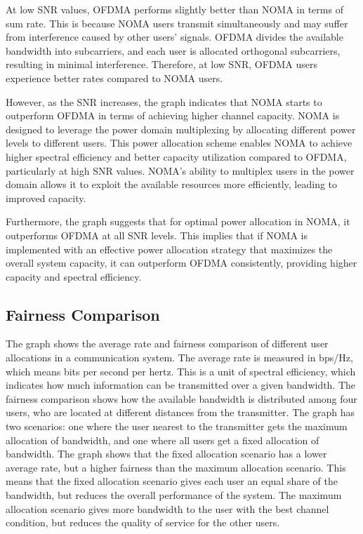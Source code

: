 \documentclass[conference]{IEEEtran}
\begin{document}
At low SNR values, OFDMA performs slightly better than NOMA in terms of sum rate. This is because NOMA users transmit simultaneously and may suffer from interference caused by other users' signals. OFDMA divides the available bandwidth into subcarriers, and each user is allocated orthogonal subcarriers, resulting in minimal interference. Therefore, at low SNR, OFDMA users experience better rates compared to NOMA users.

However, as the SNR increases, the graph indicates that NOMA starts to outperform OFDMA in terms of achieving higher channel capacity. NOMA is designed to leverage the power domain multiplexing by allocating different power levels to different users. This power allocation scheme enables NOMA to achieve higher spectral efficiency and better capacity utilization compared to OFDMA, particularly at high SNR values. NOMA's ability to multiplex users in the power domain allows it to exploit the available resources more efficiently, leading to improved capacity.

Furthermore, the graph suggests that for optimal power allocation in NOMA, it outperforms OFDMA at all SNR levels. This implies that if NOMA is implemented with an effective power allocation strategy that maximizes the overall system capacity, it can outperform OFDMA consistently, providing higher capacity and spectral efficiency.

\subsection{Fairness Comparison}

The graph shows the average rate and fairness comparison of different user allocations in a communication system. The average rate is measured in bps/Hz, which means bits per second per hertz. This is a unit of spectral efficiency, which indicates how much information can be transmitted over a given bandwidth. The fairness comparison shows how the available bandwidth is distributed among four users, who are located at different distances from the transmitter. The graph has two scenarios: one where the user nearest to the transmitter gets the maximum allocation of bandwidth, and one where all users get a fixed allocation of bandwidth. The graph shows that the fixed allocation scenario has a lower average rate, but a higher fairness than the maximum allocation scenario. This means that the fixed allocation scenario gives each user an equal share of the bandwidth, but reduces the overall performance of the system. The maximum allocation scenario gives more bandwidth to the user with the best channel condition, but reduces the quality of service for the other users. 
\end{document}

